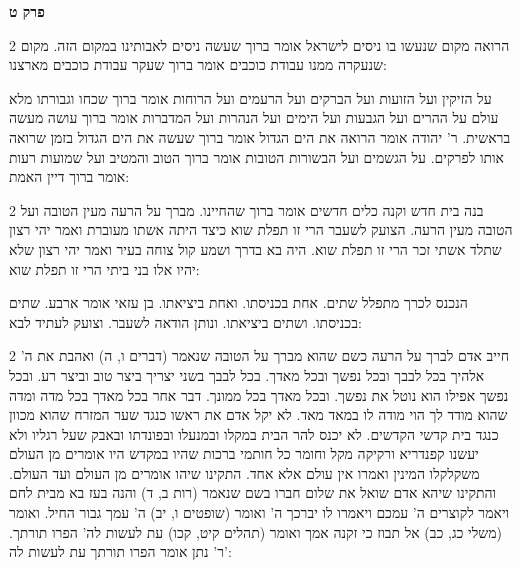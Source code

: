 \documentclass[12pt, openany]{book}
\newcommand{\sethebfont}{
\fontsize{10.5pt}{21.0pt} \selectfont
}
\newcommand{\twocol}[1]{
	{\sethebfont \begin{multicols}{2}
			#1
	\end{multicols}}	
}
\newcommand{\sectname}{}
\newcommand{\newsection}[1]{
	\addcontentsline{toc}{section}{#1}
	\renewcommand{\sectname}{#1}	
	\vspace{-\baselineskip}
	\begin{center}
		\textbf{%
\fontsize{16pt}{16pt}\selectfont
			#1}
	\end{center}
	\vspace{-\baselineskip}
	\nopagebreak
}
\begin{document}
\newsection{פרק ט}
\twocol{הרואה מקום שנעשו בו ניסים לישראל אומר ברוך שעשה ניסים לאבותינו במקום הזה. מקום שנעקרה ממנו עבודת כוכבים אומר ברוך שעקר עבודת כוכבים מארצנו: 
\par על הזיקין ועל הזועות ועל הברקים ועל הרעמים ועל הרוחות אומר ברוך שכחו וגבורתו מלא עולם על ההרים ועל הגבעות ועל הימים ועל הנהרות ועל המדברות אומר ברוך עושה מעשה בראשית. ר' יהודה אומר הרואה את הים הגדול אומר ברוך שעשה את הים הגדול בזמן שרואה אותו לפרקים. על הגשמים ועל הבשורות הטובות אומר ברוך הטוב והמטיב ועל שמועות רעות אומר ברוך דיין האמת: }
\twocol{בנה בית חדש וקנה כלים חדשים אומר ברוך שהחיינו. מברך על הרעה מעין הטובה ועל הטובה מעין הרעה. הצועק לשעבר הרי זו תפלת שוא כיצד היתה אשתו מעוברת ואמר יהי רצון שתלד אשתי זכר הרי זו תפלת שוא. היה בא בדרך ושמע קול צוחה בעיר ואמר יהי רצון שלא יהיו אלו בני ביתי הרי זו תפלת שוא: 
\par הנכנס לכרך מתפלל שתים. אחת בכניסתו. ואחת ביציאתו. בן עזאי אומר ארבע. שתים בכניסתו. ושתים ביציאתו. ונותן הודאה לשעבר. וצועק לעתיד לבא: }
\twocol{חייב אדם לברך על הרעה כשם שהוא מברך על הטובה שנאמר (דברים ו, ה) ואהבת את ה' אלהיך בכל לבבך ובכל נפשך ובכל מאדך. בכל לבבך בשני יצריך ביצר טוב וביצר רע. ובכל נפשך אפילו הוא נוטל את נפשך. ובכל מאדך בכל ממונך. דבר אחר בכל מאדך בכל מדה ומדה שהוא מודד לך הוי מודה לו במאד מאד. לא יקל אדם את ראשו כנגד שער המזרח שהוא מכוון כנגד בית קדשי הקדשים. לא יכנס להר הבית במקלו ובמנעלו ובפונדתו ובאבק שעל רגליו ולא יעשנו קפנדריא ורקיקה מקל וחומר כל חותמי ברכות שהיו במקדש היו אומרים מן העולם משקלקלו המינין ואמרו אין עולם אלא אחד. התקינו שיהו אומרים מן העולם ועד העולם. והתקינו שיהא אדם שואל את שלום חברו בשם שנאמר (רות ב, ד) והנה בעז בא מבית לחם ויאמר לקוצרים ה' עמכם ויאמרו לו יברכך ה' ואומר (שופטים ו, יב) ה' עמך גבור החיל. ואומר (משלי כג, כב) אל תבוז כי זקנה אמך ואומר (תהלים קיט, קכו) עת לעשות לה' הפרו תורתך. ר' נתן אומר הפרו תורתך עת לעשות לה': }
\end{document}
